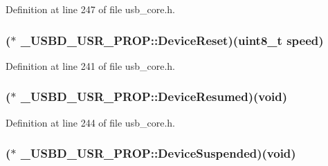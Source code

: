 Definition at line 247 of file usb\-\_\-core.\-h.

\hypertarget{struct___u_s_b_d___u_s_r___p_r_o_p_af88fae9226df19090a29a95b6f8b6ddb}{
\subsubsection[{Device\-Reset}]{($\ast$ \-\_\-\-U\-S\-B\-D\-\_\-\-U\-S\-R\-\_\-\-P\-R\-O\-P\-::\-Device\-Reset)({\bf uint8\-\_\-t} speed)}}\label{struct___u_s_b_d___u_s_r___p_r_o_p_af88fae9226df19090a29a95b6f8b6ddb}


Definition at line 241 of file usb\-\_\-core.\-h.

\hypertarget{struct___u_s_b_d___u_s_r___p_r_o_p_a6e539072c84690e10d39b2e25e41f929}{
\subsubsection[{Device\-Resumed}]{($\ast$ \-\_\-\-U\-S\-B\-D\-\_\-\-U\-S\-R\-\_\-\-P\-R\-O\-P\-::\-Device\-Resumed)({\bf void})}}\label{struct___u_s_b_d___u_s_r___p_r_o_p_a6e539072c84690e10d39b2e25e41f929}


Definition at line 244 of file usb\-\_\-core.\-h.

\hypertarget{struct___u_s_b_d___u_s_r___p_r_o_p_a008ec58e797fb37500b88bf7217a5df6}{
\subsubsection[{Device\-Suspended}]{($\ast$ \-\_\-\-U\-S\-B\-D\-\_\-\-U\-S\-R\-\_\-\-P\-R\-O\-P\-::\-Device\-Suspended)({\bf void})}}\label{struct___u_s_b_d___u_s_r___p_r_o_p_a008ec58e797fb37500b88bf7217a5df6}


